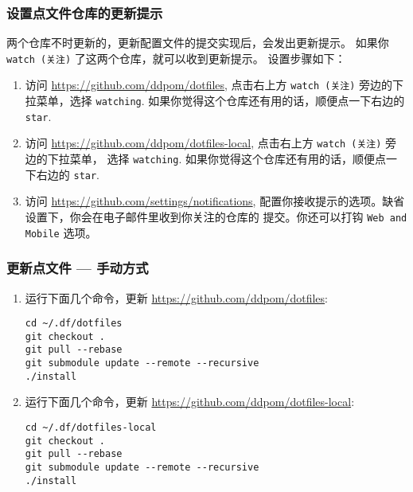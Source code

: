 \documentclass[
    11pt,
    base=hide,
    cite=authoryear,
    device=phone,
    lang=cn,
    mode=simple,
    result=answer,
    toc=onecol,
]{elegantbook_sierxue}
\begin{document}
\subsubsection{设置点文件仓库的更新提示}%
\label{ssub:vbox-guest-ganx-conf-update-notification}

两个仓库不时更新的，更新配置文件的提交实现后，会发出更新提示。
如果你 \lstinline{watch (关注)} 了这两个仓库，就可以收到更新提示。
设置步骤如下：
\begin{enumerate}
    \item 访问 \href{https://github.com/ddpom/dotfiles}
        {https://github.com/ddpom/dotfiles}, 点击右上方
        \lstinline{watch (关注)} 旁边的下拉菜单，选择 \lstinline{watching}.
        如果你觉得这个仓库还有用的话，顺便点一下右边的 \lstinline{star}.
    \item 访问 \href{https://github.com/ddpom/dotfiles-local}
        {https://github.com/ddpom/dotfiles-local},
        点击右上方 \lstinline{watch (关注)} 旁边的下拉菜单，
        选择 \lstinline{watching}.
        如果你觉得这个仓库还有用的话，顺便点一下右边的 \lstinline{star}.
    \item 访问 \href{https://github.com/settings/notifications}
        {https://github.com/settings/notifications},
        配置你接收提示的选项。缺省设置下，你会在电子邮件里收到你关注的仓库的
        提交。你还可以打钩 \lstinline{Web and Mobile} 选项。
\end{enumerate}

\subsubsection{更新点文件 --- 手动方式}%
\label{ssub:update-dotfiles-manual}

\begin{enumerate}
    \item 运行下面几个命令，更新 \href{https://github.com/ddpom/dotfiles}
        {https://github.com/ddpom/dotfiles}:
\begin{lstlisting}[escapeinside=``]
cd ~/.df/dotfiles
git checkout .
git pull --rebase
git submodule update --remote --recursive
./install
\end{lstlisting}
    \item 运行下面几个命令，更新
        \href{https://github.com/ddpom/dotfiles-local}
        {https://github.com/ddpom/dotfiles-local}:
\begin{lstlisting}[escapeinside=``]
cd ~/.df/dotfiles-local
git checkout .
git pull --rebase
git submodule update --remote --recursive
./install
\end{lstlisting}
\end{enumerate}
\end{document}
